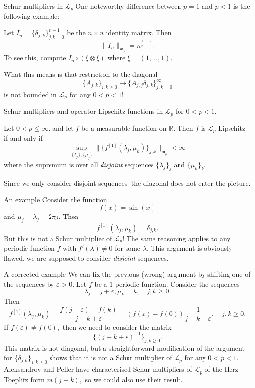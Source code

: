 \documentclass{beamer}
\numberwithin{equation}{section}
\theoremstyle{plain}
\theoremstyle{plain}
\theoremstyle{definition}
\theoremstyle{plain}
\theoremstyle{plain}
\theoremstyle{definition}
\newcommand{\Rl}{\mathbb{R}}
\newcommand{\Lc}{\mathcal{L}}
\newcommand{\mf}{\mathfrak{m}}
\begin{document}
\begin{frame}{Schur multipliers in $\Lc_p$}
    One noteworthy difference between $p=1$ and $p<1$ is the following example:
    \begin{example}
        Let $I_n = \{\delta_{j,k}\}_{j,k=0}^{n-1}$ be the $n\times n$ identity matrix. Then
        \[
            \|I_n\|_{\mf_p} = n^{\frac1p-1}.
        \]
        To see this, compute $I_n\circ (\xi\otimes \xi)$ where $\xi = (1,\ldots,1).$
    \end{example}
    \pause
    What this means is that restriction to the diagonal
    \[
        \{A_{j,k}\}_{j,k\geq 0} \mapsto \{A_{j,j}\delta_{j,k}\}_{j,k=0}^\infty
    \]
    is not bounded in $\Lc_p$ for any $0<p<1$!
\end{frame}



\begin{frame}{Schur multipliers and operator-Lipschitz functions in $\Lc_p$ for $0<p<1.$}
    \begin{theorem}
        Let $0< p\leq \infty.$ and let $f$ be a measurable function on $\Rl.$ Then $f$ is $\Lc_p$-Lipschitz if and only if
        \[
            \sup_{\{\lambda_j\},\{\mu_j\}} \|\{f^{[1]}(\lambda_j,\mu_k)\}_{j,k}\|_{\mf_p} < \infty
        \]
        where the supremum is over all \emph{disjoint} sequences $\{\lambda_j\}_{j}$ and $\{\mu_k\}_k.$
    \end{theorem}
    Since we only consider disjoint sequences, the diagonal does not enter the picture.
\end{frame}


\begin{frame}{An example}
    Consider the function
    \[
        f(x) = \sin(x)
    \]
    and $\mu_j=\lambda_j=2\pi j.$ Then
    \[
        f^{[1]}(\lambda_j,\mu_k) = \delta_{j,k}.
    \]
    But this is not a Schur multiplier of $\Lc_p$! The same reasoning applies to any periodic function $f$ with $f'(\lambda)\neq 0$ for some $\lambda.$
    \pause
    This argument is obviously flawed, we are supposed to consider \emph{disjoint} sequences.
\end{frame}

\begin{frame}{A corrected example}
    We can fix the previous (wrong) argument by shifting one of the sequences by $\varepsilon>0.$ Let $f$ be a $1$-periodic function. Consider the sequences
    \[
        \lambda_j = j+\varepsilon, \mu_k = k,\quad j,k\geq 0.
    \]
    Then
    \[
        f^{[1]}(\lambda_j,\mu_k) = \frac{f(j+\varepsilon)-f(k)}{j-k+\varepsilon} = (f(\varepsilon)-f(0))\frac{1}{j-k+\varepsilon},\quad j,k\geq 0.
    \]
    If $f(\varepsilon)\neq f(0),$ then we need to consider the matrix
    \[
        \{(j-k+\varepsilon)^{-1}\}_{j,k\geq 0}.
    \]
    This matrix is not diagonal, but a straightforward modification of the argument for $\{\delta_{j,k}\}_{j,k\geq 0}$ shows that it is not a Schur multiplier of $\Lc_p$ for any $0<p<1.$
    \pause
    Aleksandrov and Peller have characterised Schur multipliers of $\Lc_p$ of the Herz-Toeplitz form $m(j-k),$ so we could also use their result.
\end{frame}
\end{document}
